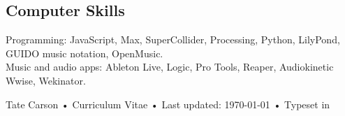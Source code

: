 \documentclass[10pt, a4paper]{article}
\begin{document}
\subsection*{Computer Skills}
Programming: JavaScript, Max, SuperCollider, Processing, Python, LilyPond, GUIDO music notation, OpenMusic. \\
Music and audio apps: Ableton Live, Logic, Pro Tools, Reaper, Audiokinetic Wwise, Wekinator. 



\vfill{}

\begin{center}
{\scriptsize  Tate Carson •\- Curriculum Vitae •\- Last updated: \today\- •\- %
Typeset in \href{http://nitens.org/taraborelli/cvtex}{
\XeTeX }\\
}
\end{center}
\end{document}
